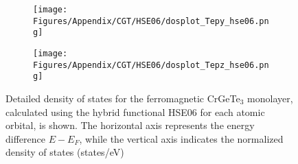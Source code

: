 \begin{figure}[H]
\begin{subfigure}{0.24\textwidth}
    \label{dosplot_Tepx_hse06}
\end{subfigure}
\hfill
\begin{subfigure}{0.24\textwidth}
    \texttt{[image: Figures/Appendix/CGT/HSE06/dosplot\_Tepy\_hse06.png]}
    \label{dosplot_Tepy_hse06}
\end{subfigure}
\begin{subfigure}{0.24\textwidth}
    \texttt{[image: Figures/Appendix/CGT/HSE06/dosplot\_Tepz\_hse06.png]}
    \label{dosplot_Tepz_hse06}
\end{subfigure}
\hfill
     \caption{Detailed density of states for the ferromagnetic CrGeTe$_3$ monolayer, calculated using the hybrid functional HSE06 for each atomic orbital, is shown. The horizontal axis represents the energy difference $E - E_F$, while the vertical axis indicates the normalized density of states (states/eV)}
     \label{Crhse06}
 \end{figure}

